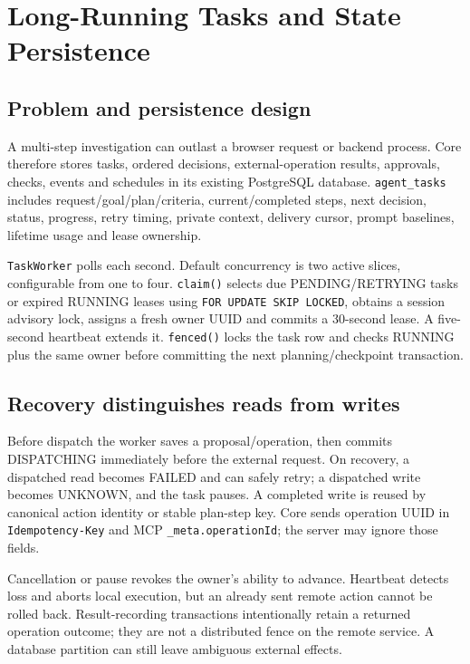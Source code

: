 \chapter{Long-Running Tasks and State Persistence}
\section{Problem and persistence design}
A multi-step investigation can outlast a browser request or backend process. Core therefore stores tasks, ordered decisions, external-operation results, approvals, checks, events and schedules in its existing PostgreSQL database. \texttt{agent\_tasks} includes request/goal/plan/criteria, current/completed steps, next decision, status, progress, retry timing, private context, delivery cursor, prompt baselines, lifetime usage and lease ownership.

\texttt{TaskWorker} polls each second. Default concurrency is two active slices, configurable from one to four. \texttt{claim()} selects due PENDING/RETRYING tasks or expired RUNNING leases using \texttt{FOR UPDATE SKIP LOCKED}, obtains a session advisory lock, assigns a fresh owner UUID and commits a 30-second lease. A five-second heartbeat extends it. \texttt{fenced()} locks the task row and checks RUNNING plus the same owner before committing the next planning/checkpoint transaction.
\section{Recovery distinguishes reads from writes}
Before dispatch the worker saves a proposal/operation, then commits DISPATCHING immediately before the external request. On recovery, a dispatched read becomes FAILED and can safely retry; a dispatched write becomes UNKNOWN, and the task pauses. A completed write is reused by canonical action identity or stable plan-step key. Core sends operation UUID in \texttt{Idempotency-Key} and MCP \texttt{\_meta.operationId}; the server may ignore those fields.

Cancellation or pause revokes the owner's ability to advance. Heartbeat detects loss and aborts local execution, but an already sent remote action cannot be rolled back. Result-recording transactions intentionally retain a returned operation outcome; they are not a distributed fence on the remote service. A database partition can still leave ambiguous external effects.
